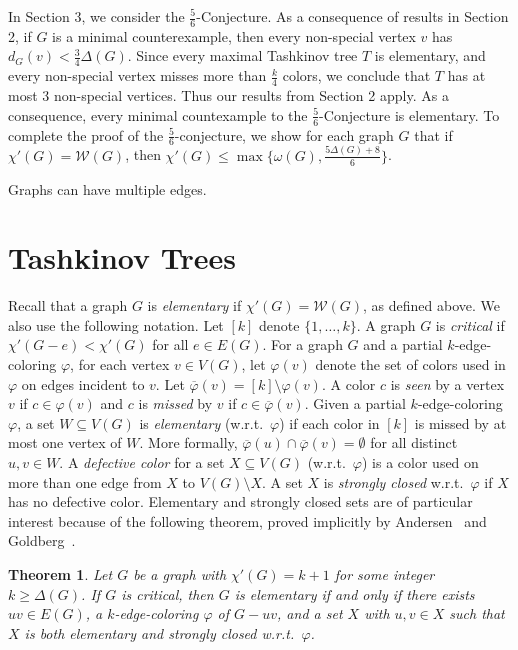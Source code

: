 \documentclass[12pt]{amsart}
\theoremstyle{plain}
\newtheorem{thm}{Theorem}
\theoremstyle{definition}
\theoremstyle{remark}
\newcommand{\fancy}[1]{\mathcal{#1}}
\newcommand{\W}{\fancy{W}}
\newcommand{\vph}{\varphi}
\newcommand{\vphn}{\overline{\varphi}}
\begin{document}
In Section 3, we consider the %
$\frac56$-Conjecture.  As a consequence of results in Section 2,
if $G$ is a minimal counterexample, then every non-special vertex $v$ has
$d_G(v)<\frac34\Delta(G)$.  Since every maximal Tashkinov tree $T$ is
elementary, and every non-special vertex misses more than $\frac{k}4$ colors, we
conclude that $T$ has at most 3 non-special vertices.  Thus our results from
Section 2 apply.  As a consequence, every minimal countexample to the
$\frac56$-Conjecture is elementary.  To complete the proof of the $\frac56$-conjecture,
we show for each graph $G$ that if $\chi'(G)=\W(G)$, then
$\chi'(G)\le\max\{\omega(G),\frac{5\Delta(G)+8}6\}$.


Graphs can have multiple edges.

\section{Tashkinov Trees}
Recall that a graph $G$ is \emph{elementary} if $\chi'(G)=\W(G)$, as defined
above.  We also use the following notation.  
Let $[k]$ denote $\{1,\ldots,k\}$.
A graph $G$ is \emph{critical} if $\chi'(G-e) < \chi'(G)$ for all $e \in E(G)$. 
For a graph $G$ and a partial $k$-edge-coloring $\varphi$, for each vertex $v\in
V(G)$, let $\varphi(v)$ denote the set of colors used in $\varphi$ on edges
incident to $v$.  Let $\vphn(v)=[k]\setminus\varphi(v)$.  A color $c$ is
\emph{seen} by a vertex $v$ if $c\in \varphi(v)$ and $c$ is \emph{missed} by $v$
if $c\in\vphn(v)$.
Given a partial $k$-edge-coloring $\varphi$, a set $W\subseteq V(G)$ is
\emph{elementary} (w.r.t.~$\varphi$) if each color in $[k]$ is
missed by at most one vertex of $W$.  More formally, $\vphn(u)\cap
\vphn(v)=\emptyset$ for all distinct $u,v\in W$.
A \emph{defective color} for a set $X\subseteq V(G)$ (w.r.t.~$\varphi$) is a color
used on more than one edge from $X$ to $V(G) \setminus X$.  
A set $X$ is \emph{strongly closed} w.r.t.~$\varphi$ if $X$ has no 
defective color.
Elementary and strongly closed sets are of particular interest because of the
following theorem, proved implicitly by Andersen~\cite{} and Goldberg~\cite{}.
% 

\begin{thm}
\label{elementary}
Let $G$ be a graph with $\chi'(G)=k+1$ for some integer $k\ge \Delta(G)$.  If
$G$ is critical, then $G$ is elementary if and only if there exists $uv\in E(G)$,
a $k$-edge-coloring $\vph$ of $G-uv$, and a set $X$ with $u,v\in X$ such
that $X$ is both elementary and strongly closed w.r.t.~$\varphi$.
\end{thm}
\end{document}
